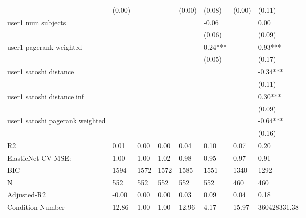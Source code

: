 \begin{table*}
\begin{center}
\begin{tabular}{llllllll}
                                                 & (0.00)   &            &         & (0.00)  & (0.08)   & (0.00)             & (0.11)        \\
user1 num subjects                               &          &            &         &         & -0.06    &                    & 0.00          \\
                                                 &          &            &         &         & (0.06)   &                    & (0.09)        \\
user1 pagerank weighted                          &          &            &         &         & 0.24***  &                    & 0.93***       \\
                                                 &          &            &         &         & (0.05)   &                    & (0.17)        \\
user1 satoshi distance                           &          &            &         &         &          &                    & -0.34***      \\
                                                 &          &            &         &         &          &                    & (0.11)        \\
user1 satoshi distance inf                       &          &            &         &         &          &                    & 0.30***       \\
                                                 &          &            &         &         &          &                    & (0.09)        \\
user1 satoshi pagerank weighted                  &          &            &         &         &          &                    & -0.64***      \\
                                                 &          &            &         &         &          &                    & (0.16)        \\
R2                                               & 0.01     & 0.00       & 0.00    & 0.04    & 0.10     & 0.07               & 0.20          \\
ElasticNet CV MSE:                               & 1.00     & 1.00       & 1.02    & 0.98    & 0.95     & 0.97               & 0.91          \\
BIC                                              & 1594     & 1572       & 1572    & 1585    & 1551     & 1340               & 1292          \\
N                                                & 552      & 552        & 552     & 552     & 552      & 460                & 460           \\
Adjusted-R2                                      & -0.00    & 0.00       & 0.00    & 0.03    & 0.09     & 0.04               & 0.18          \\
Condition Number                                 & 12.86    & 1.00       & 1.00    & 12.96   & 4.17     & 15.97              & 360428331.38  \\
\hline
\end{tabular}
\end{center}
\end{table*}